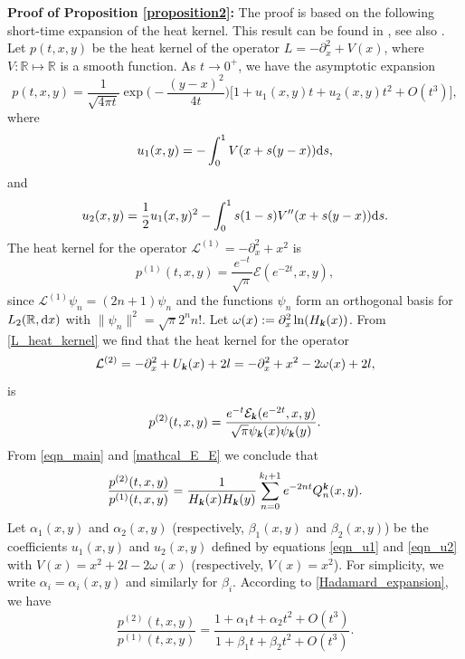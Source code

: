 \documentclass[12pt]{article}
\def\E{{\mathcal E}}
\def\r{{\mathbb R}}
\def\d{{\textnormal d}}
\def\k{\textbf{\textsl{k}}}
\begin{document}
\noindent
{\bf Proof of Proposition \ref{proposition2}:}
The proof is based on the following short-time expansion of the heat kernel. This result can be found in  \cite[Section 5.9]{Avramidi2015}, see also  \cite{Iliev2005,Vassilevich2003}. Let $p(t,x,y)$ be the heat kernel of the operator  $L=-\partial_x^2+V(x)$, where $V : \r \mapsto \r$ is a smooth function. As $t\to 0^+$, we have the asymptotic expansion 
\begin{equation}\label{Hadamard_expansion}
p(t,x,y)= \frac{1}{\sqrt{4\pi t}} 
\exp\Big( -\frac{(y-x)^2}{4t} \Big) 
\big[ 1 + u_1(x,y) t + u_2(x,y) t^2+O(t^3) \big],
\end{equation}
where
\begin{equation}\label{eqn_u1}
u_1(x,y)=-\int_0^1 V(x+s(y-x)) \d s, 
\end{equation}
and 
\begin{equation}\label{eqn_u2}
u_2(x,y)=\frac{1}{2} u_1(x,y)^2 - \int_0^1 
s(1-s) V''(x+s(y-x)) \d s.
\end{equation}
The heat kernel for the operator ${\mathcal L}^{(1)}=-\partial_x^2+x^2$ is 
\[
p^{(1)}(t,x,y)=\frac{ e^{-t}}{\sqrt{\pi}} \E(e^{-2t},x,y),
\]
since ${\mathcal L}^{(1)} \psi_n=(2n+1) \psi_n$ and the functions $\psi_n$ form an orthogonal basis for $L_2(\r,\d x)$ with $\lVert \psi_n \rVert^2=\sqrt{\pi} 2^n n!$. 
Let $\omega(x):=\partial_x^2 \ln(H_{\k}(x))$. From \eqref{L_heat_kernel} we find that the heat kernel for the operator 
\[
{\mathcal L}^{(2)}=-\partial_x^2+U_{\k}(x)+2l=-\partial_x^2+x^2-2\omega(x)+2l, 
\] 
 is 
\[
p^{(2)}(t,x,y)=\frac{e^{-t} \E_{\k}(e^{-2t},x,y)}{\sqrt{\pi} \psi_{\k}(x) \psi_{\k}(y)}.
\] 
From \eqref{eqn_main} and \eqref{mathcal_E_E} we conclude that 
\begin{equation}\label{p_ratio1}
\frac{p^{(2)}(t,x,y)}{p^{(1)}(t,x,y)}=\frac{1}{H_{\k}(x) H_{\k}(y)}
\sum\limits_{n=0}^{k_l+1} e^{-2nt} Q_n^{\k}(x,y). 
\end{equation}
Let $\alpha_1(x,y)$ and $\alpha_2(x,y)$ (respectively, $\beta_1(x,y)$ and $\beta_2(x,y)$) be the coefficients $u_1(x,y)$ and $u_2(x,y)$ defined by equations \eqref{eqn_u1} and \eqref{eqn_u2} with $V(x)=x^2+2l-2\omega(x)$ (respectively, $V(x)=x^2$). For simplicity, we write $\alpha_i=\alpha_i(x,y)$ and similarly for $\beta_i$. According to \eqref{Hadamard_expansion}, we have 
\begin{equation}\label{p_ratio2}
\frac{p^{(2)}(t,x,y)}{p^{(1)}(t,x,y)}=
\frac{1+\alpha_1 t+\alpha_2 t^2+O(t^3)}{1+\beta_1 t + \beta_2 t^2 + O(t^3)}.
\end{equation}
\end{document}
